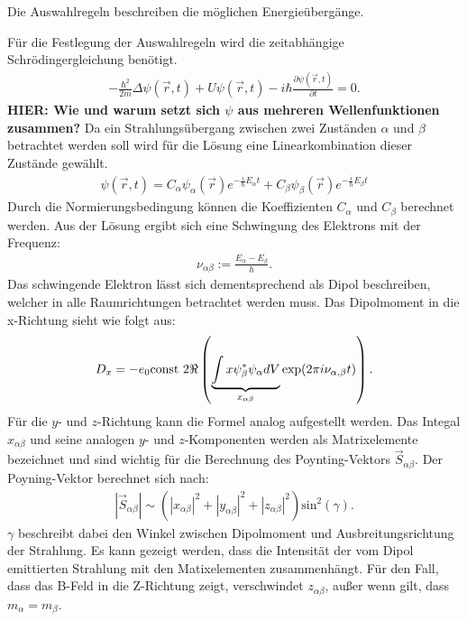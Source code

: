 Die Auswahlregeln beschreiben die möglichen Energieübergänge.

Für die Festlegung der Auswahlregeln wird die zeitabhängige Schrödingergleichung benötigt.
\begin{align}
	-\frac{\hbar^2}{2m}\Delta \psi(\vec{r},t)+U\psi(\vec{r},t)-i\hbar\frac{\partial \psi(\vec{r},t)}{\partial t}=0.
\end{align}
\textbf{\huge{HIER: Wie und warum setzt sich $\psi$ aus mehreren Wellenfunktionen zusammen?}}
Da ein Strahlungsübergang zwischen zwei Zuständen $\alpha$ und $\beta$ betrachtet werden soll wird für die Lösung eine Linearkombination dieser Zustände gewählt.%
\begin{align*}
  \psi(\vec{r},t)=C_{\alpha}\psi_{\alpha}(\vec{r})e^{-\frac{i}{\hbar}E_{\alpha}t}+C_{\beta}\psi_{\beta}(\vec{r})e^{-\frac{i}{\hbar}E_{\beta}t}
\end{align*}
Durch die Normierungsbedingung können die Koeffizienten $C_{\alpha}$ und $C_{\beta}$ berechnet werden.
Aus der Lösung ergibt sich eine Schwingung des Elektrons mit der Frequenz:
\begin{align*}
  \nu_{\alpha\beta}:=\frac{E_\alpha-E_\beta}{h}.
\end{align*}
Das schwingende Elektron lässt sich dementsprechend als Dipol beschreiben, welcher in alle Raumrichtungen betrachtet werden muss.
Das Dipolmoment in die x-Richtung sieht wie folgt aus:
\begin{align*}
  	D_x=-e_0\text{const } 2 \Re \real\left( \underbrace{\int x\psi^*_\beta\psi_\alpha dV}_{x_{\alpha\beta}}\exp(2\pi i\nu_{\alpha,\beta}t) \right).
\end{align*}
Für die $y$- und $z$-Richtung kann die Formel analog aufgestellt werden.
Das Integal $x_{\alpha\beta}$ und seine analogen $y$- und $z$-Komponenten werden als Matrixelemente bezeichnet und sind wichtig für die Berechnung des Poynting-Vektors $\vec{S}_{\alpha\beta}$.
Der Poyning-Vektor berechnet sich nach:
\begin{align*}
  |\vec{S}_{\alpha\beta}| \sim \left(|x_{\alpha\beta}|^2+|y_{\alpha\beta}|^2+|z_{\alpha\beta}|^2\right) \text{sin}^2(\gamma).
\end{align*}
$\gamma$ beschreibt dabei den Winkel zwischen Dipolmoment und Ausbreitungsrichtung der Strahlung.
Es kann gezeigt werden, dass die Intensität der vom Dipol emittierten Strahlung mit den Matixelementen zusammenhängt.
Für den Fall, dass das B-Feld in die Z-Richtung zeigt, verschwindet $z_{\alpha\beta}$, außer wenn gilt, dass $m_{\alpha} = m_{\beta}$.
